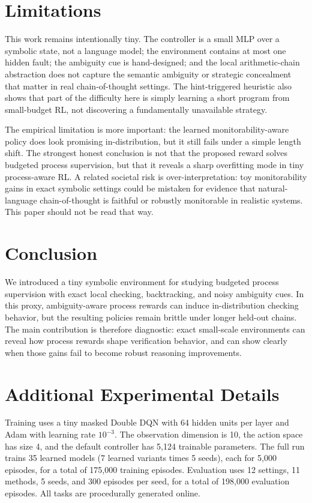 \documentclass{article}
\begin{document}
\section{Limitations}
This work remains intentionally tiny. The controller is a small MLP over a symbolic state, not a language model; the environment contains at most one hidden fault; the ambiguity cue is hand-designed; and the local arithmetic-chain abstraction does not capture the semantic ambiguity or strategic concealment that matter in real chain-of-thought settings. The hint-triggered heuristic also shows that part of the difficulty here is simply learning a short program from small-budget RL, not discovering a fundamentally unavailable strategy.

The empirical limitation is more important: the learned monitorability-aware policy does look promising in-distribution, but it still fails under a simple length shift. The strongest honest conclusion is not that the proposed reward solves budgeted process supervision, but that it reveals a sharp overfitting mode in tiny process-aware RL. A related societal risk is over-interpretation: toy monitorability gains in exact symbolic settings could be mistaken for evidence that natural-language chain-of-thought is faithful or robustly monitorable in realistic systems. This paper should not be read that way.

\section{Conclusion}
We introduced a tiny symbolic environment for studying budgeted process supervision with exact local checking, backtracking, and noisy ambiguity cues. In this proxy, ambiguity-aware process rewards can induce in-distribution checking behavior, but the resulting policies remain brittle under longer held-out chains. The main contribution is therefore diagnostic: exact small-scale environments can reveal how process rewards shape verification behavior, and can show clearly when those gains fail to become robust reasoning improvements.




\appendix

\section{Additional Experimental Details}
Training uses a tiny masked Double DQN with 64 hidden units per layer and Adam with learning rate $10^{-3}$. The observation dimension is 10, the action space has size 4, and the default controller has 5,124 trainable parameters. The full run trains 35 learned models (7 learned variants times 5 seeds), each for 5,000 episodes, for a total of 175,000 training episodes. Evaluation uses 12 settings, 11 methods, 5 seeds, and 300 episodes per seed, for a total of 198,000 evaluation episodes. All tasks are procedurally generated online.
\end{document}
